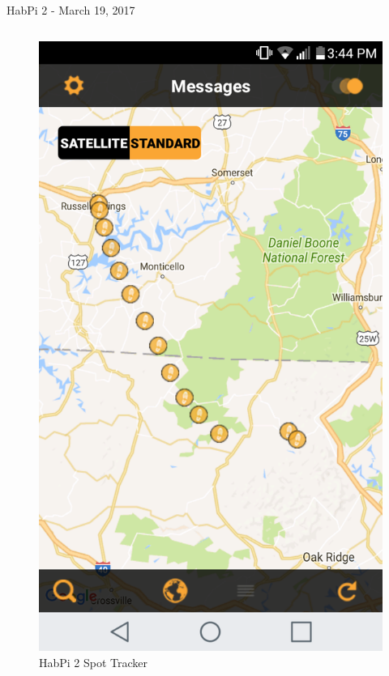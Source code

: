\documentclass[handout]{beamer}
\begin{document}
\begin{frame}[t]{HabPi 2 - March 19, 2017}
\begin{columns}[t]
        \begin{figure}
            \centering
            \includegraphics[height=0.6\textheight]{images/habpi2_track}
            \caption{\tiny HabPi 2 Spot Tracker}
        \end{figure}
    \end{columns}
\end{frame}
\end{document}

